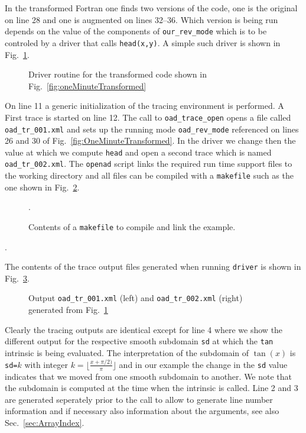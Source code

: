 \documentclass{article}
\newcommand{\refsec}[1]{{Sec.~\ref{#1}}}
\newcommand{\reffig}[1]{{Fig.~\ref{#1}}}
\begin{document}
In the transformed Fortran one finds two versions of the code, one is the original 
on line 28 and one is augmented on lines 32--36. Which version is being run depends 
on the value of the components of \lstinline{our_rev_mode} which is to be controled 
by a driver that calls \lstinline{head(x,y)}.
A simple such driver is shown in \reffig{fig:oneMinuteDriver}. 
\begin{figure}

\caption{Driver routine for the transformed code  shown in \reffig{fig:oneMinuteTransformed}}\label{fig:oneMinuteDriver}
\end{figure}
On line 11 a generic initialization of the tracing environment is performed.  A First trace is 
started on line 12. The call to \lstinline{oad_trace_open} opens a file called 
\lstinline{oad_tr_001.xml} and sets up the running mode \lstinline{oad_rev_mode} 
referenced on lines 26 and 30 of \reffig{fig:OneMinuteTransformed}.
In the driver we change then the value at which we compute \lstinline{head} and 
open a second trace which is named \lstinline{oad_tr_002.xml}. 
The \lstinline{openad} script links the required run time support files 
to the working directory and all files can be compiled with 
a \lstinline{makefile} such as the one shown in \reffig{fig:OneMinuteMake}.
\begin{figure}
\hspace*{.5cm}\begin{minipage}{\textwidth}
\scriptsize{}
\end{minipage}
\caption{Contents of a \lstinline{makefile} to compile and link the example.}\label{fig:OneMinuteMake}.
\end{figure}.

The contents of the trace output files generated when running \lstinline{driver} 
is shown in \reffig{fig:OneMinuteXMLOutput}.
\begin{figure}
\begin{minipage}{.5\textwidth}

\end{minipage}
\begin{minipage}{.5\textwidth}

\end{minipage}
\caption{Output \lstinline{oad_tr_001.xml} (left) 
and \lstinline{oad_tr_002.xml} (right) 
generated from \reffig{fig:oneMinuteDriver}}\label{fig:OneMinuteXMLOutput}
\end{figure}
Clearly the tracing outputs are identical except for line 4 where we show the 
different output for the respective smooth subdomain \lstinline{sd} at which the 
\lstinline{tan} intrinsic is being evaluated. The interpretation of the subdomain of $\tan(x)$ 
is \lstinline{sd=}$k$ with integer $k=\lfloor\frac{x+\pi/2)}{\pi}\rfloor$ and in our 
example the change in the \lstinline{sd} value  indicates that we moved from one smooth 
subdomain to another. 
We note that the subdomain is computed at the time when the intrinsic is called. Line 2 and 3 
are generated seperately prior to the call to allow to generate line number information 
and if necessary also information about the arguments, see also \refsec{sec:ArrayIndex}.
\end{document}
